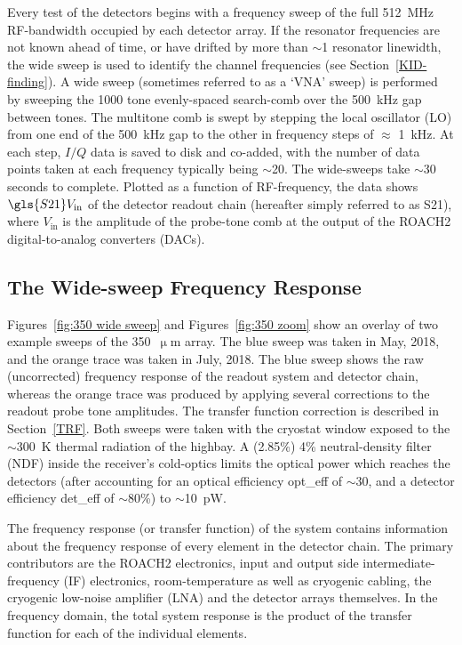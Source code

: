 Every test of the detectors begins with a frequency sweep of the full 512~MHz RF-bandwidth occupied by each detector array. If the resonator frequencies are not known ahead of time, or have drifted by more than $\sim$1 resonator linewidth, the wide sweep is used to identify the channel frequencies (see Section~\ref{KID-finding}). A wide sweep (sometimes referred to as a `VNA' sweep) is performed by sweeping the 1000 tone evenly-spaced search-comb over the 500~kHz gap between tones. The multitone comb is swept by stepping the local oscillator (LO) from one end of the 500~kHz gap to the other in frequency steps of $\approx$ 1~kHz. At each step, $I/Q$ data is saved to disk and co-added, with the number of data points taken at each frequency typically being $\sim$20. The wide-sweeps take $\sim$30 seconds to complete. Plotted as a function of RF-frequency, the data shows $\gls{S21}V_{\mathrm{in}}$ of the detector readout chain (hereafter simply referred to as \gls{S21}), where $V_{\mathrm{in}}$ is the amplitude of the probe-tone comb at the output of the ROACH2 digital-to-analog converters (DACs).

\subsection{The Wide-sweep Frequency Response}\label{freq response}

Figures~\ref{fig:350 wide sweep} and Figures~\ref{fig:350 zoom} show an overlay of two example sweeps of the 350~$\upmu$m array. The blue sweep was taken in May, 2018, and the orange trace was taken in July, 2018. The blue sweep shows the raw (uncorrected) frequency response of the readout system and detector chain, whereas the orange trace was produced by applying several corrections to the readout probe tone amplitudes. The transfer function correction is described in Section~\ref{TRF}. Both sweeps were taken with the cryostat window exposed to the $\sim$300~K thermal radiation of the highbay. A (2.85\%) 4\% neutral-density filter (NDF) inside the receiver's cold-optics limits the optical power which reaches the detectors (after accounting for an optical efficiency \gls{opt_eff} of $\sim$30, and a detector efficiency \gls{det_eff} of $\sim$80\%) to $\sim$10~pW.

The frequency response (or transfer function) of the system contains information about the frequency response of every element in the detector chain. The primary contributors are the ROACH2 electronics, input and output side intermediate-frequency (IF) electronics, room-temperature as well as cryogenic cabling, the cryogenic low-noise amplifier (LNA) and the detector arrays themselves. In the frequency domain, the total system response is the product of the transfer function for each of the individual elements.

